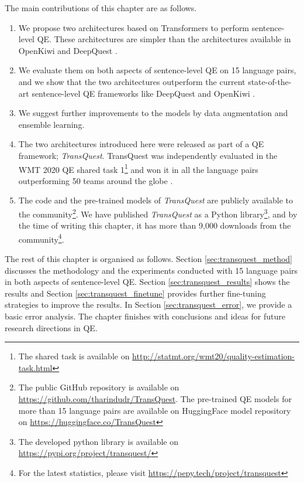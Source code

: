      
The main contributions of this chapter are as follows.
\begin{enumerate}
	\item We propose two architectures based on Transformers to perform sentence-level QE. These architectures are simpler than the architectures available in OpenKiwi and DeepQuest \autocite{lee-2020-two, wang-etal-2018-alibaba}. 
	
	\item We evaluate them on both aspects of sentence-level QE on 15 language pairs, and we show that the two architectures outperform the current state-of-the-art sentence-level QE frameworks like DeepQuest \autocite{ive-etal-2018-deepquest} and OpenKiwi \autocite{kepler-etal-2019-openkiwi}.
	
	\item We suggest further improvements to the models by data augmentation and ensemble learning.
		
	\item The two architectures introduced here were released as part of a QE framework; \textit{TransQuest}. TransQuest was independently evaluated in the WMT 2020 QE shared task 1\footnote{The shared task is available on \url{http://statmt.org/wmt20/quality-estimation-task.html}} \autocite{specia-etal-2020-findings-wmt} and won it in all the language pairs outperforming 50 teams around the globe \autocite{ranasinghe-etal-2020-transquest-wmt2020}.
	
	\item The code and the pre-trained models of \textit{TransQuest} are publicly available to the community\footnote{The public GitHub repository is available on \url{https://github.com/tharindudr/TransQuest}. The pre-trained QE models for more than 15 language pairs are available on HuggingFace model repository on \url{https://huggingface.co/TransQuest}}. We have published \textit{TransQuest} as a Python library\footnote{The developed python library is available on \url{https://pypi.org/project/transquest/}}, and by the time of writing this chapter, it has more than 9,000 downloads from the community\footnote{For the latest statistics, please visit \url{https://pepy.tech/project/transquest}}. 
	
\end{enumerate}

The rest of this chapter is organised as follows. Section \ref{sec:transquest_method} discusses the methodology and the experiments conducted with 15 language pairs in both aspects of sentence-level QE.  Section \ref{sec:transquest_results} shows the results and Section \ref{sec:transquest_finetune} provides further fine-tuning strategies to improve the results. In Section \ref{sec:transquest_error}, we provide a basic error analysis. The chapter finishes with conclusions and ideas for future research directions in QE.

